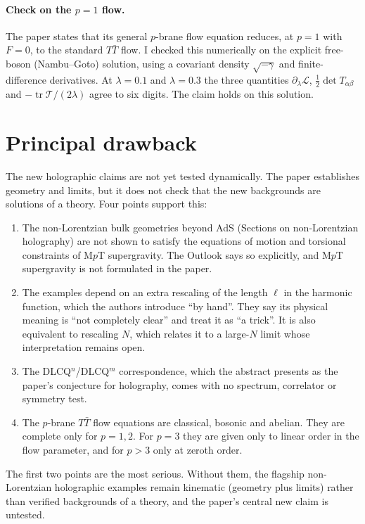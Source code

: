 \documentclass[11pt]{article}
\begin{document}
\paragraph{Check on the $p=1$ flow.} The paper states that its general $p$-brane flow equation reduces, at $p=1$ with $F=0$, to the standard $T\bar T$ flow. I checked this numerically on the explicit free-boson (Nambu--Goto) solution, using a covariant density $\sqrt{-\gamma}$ and finite-difference derivatives. At $\lambda=0.1$ and $\lambda=0.3$ the three quantities $\partial_\lambda\mathcal L$, $\tfrac12\det T_{\alpha\beta}$ and $-\operatorname{tr}\mathcal T/(2\lambda)$ agree to six digits. The claim holds on this solution.

\section{Principal drawback}

The new holographic claims are not yet tested dynamically. The paper establishes geometry and limits, but it does not check that the new backgrounds are solutions of a theory. Four points support this:
\begin{enumerate}
\item The non-Lorentzian bulk geometries beyond AdS (Sections on non-Lorentzian holography) are not shown to satisfy the equations of motion and torsional constraints of M$p$T supergravity. The Outlook says so explicitly, and M$p$T supergravity is not formulated in the paper.
\item The examples depend on an extra rescaling of the length $\ell$ in the harmonic function, which the authors introduce ``by hand''. They say its physical meaning is ``not completely clear'' and treat it as ``a trick''. It is also equivalent to rescaling $N$, which relates it to a large-$N$ limit whose interpretation remains open.
\item The DLCQ$^n$/DLCQ$^m$ correspondence, which the abstract presents as the paper's conjecture for holography, comes with no spectrum, correlator or symmetry test.
\item The $p$-brane $T\bar T$ flow equations are classical, bosonic and abelian. They are complete only for $p=1,2$. For $p=3$ they are given only to linear order in the flow parameter, and for $p>3$ only at zeroth order.
\end{enumerate}
The first two points are the most serious. Without them, the flagship non-Lorentzian holographic examples remain kinematic (geometry plus limits) rather than verified backgrounds of a theory, and the paper's central new claim is untested.
\end{document}
